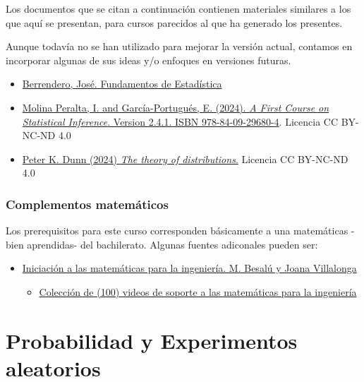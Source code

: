 \documentclass[
]{article}
\providecommand{\tightlist}{%
  \setlength{\itemsep}{0pt}\setlength{\parskip}{0pt}}
\begin{document}
Los documentos que se citan a continuación contienen materiales similares a los que aquí se presentan, para cursos parecidos al que ha generado los presentes.

Aunque todavía no se han utilizado para mejorar la versión actual, contamos en incorporar algunas de sus ideas y/o enfoques en versiones futuras.

\begin{itemize}
\item
  \href{https://verso.mat.uam.es/~joser.berrendero/libro-est/}{Berrendero, José. Fundamentos de Estadística}
\item
  \href{https://bookdown.org/egarpor/inference/}{Molina Peralta, I. and García-Portugués, E. (2024). \emph{A First Course on Statistical Inference}. Version 2.4.1. ISBN 978-84-09-29680-4}. Licencia CC BY-NC-ND 4.0
\item
  \href{https://bookdown.org/pkaldunn/DistTheory}{Peter K. Dunn (2024) \emph{The theory of distributions}.} Licencia CC BY-NC-ND 4.0
\end{itemize}

\subsubsection*{Complementos matemáticos}\label{complementos-matemuxe1ticos}

Los prerequisitos para este curso corresponden básicamente a una matemáticas -bien aprendidas- del bachilerato. Algunas fuentes adiconales pueden ser:

\begin{itemize}
\item
  \href{http://cimanet.uoc.edu/cursMates0/IniciacionMatematicas/pdf/PID_00273914.pdf}{Iniciación a las matemáticas para la ingeniería. M. Besalú y Joana Villalonga}

  \begin{itemize}
  \tightlist
  \item
    \href{https://www.youtube.com/playlist?list=PLv8FweHfYYMo6Lr2zt6H4znq5KuBacq28}{Colección de (100) videos de soporte a las matemáticas para la ingeniería}
  \end{itemize}
\end{itemize}

\newpage

\section{Probabilidad y Experimentos aleatorios}\label{probabilidad-y-experimentos-aleatorios}
\end{document}
